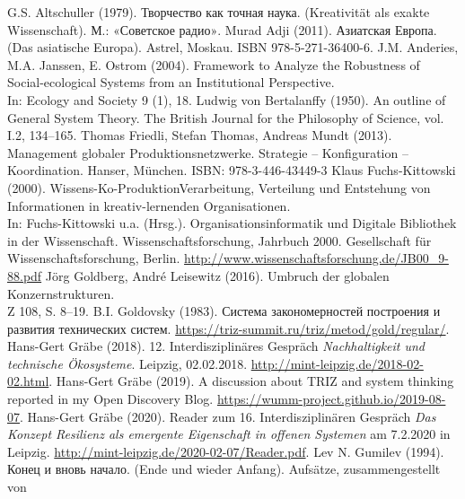 \documentclass[11pt,a4paper]{article}
\begin{document}
\begin{thebibliography}{xxx}
 G.S. Altschuller (1979).
  \foreignlanguage{russian}{Творчество как точная наука.} (Kreativität als
  exakte Wissenschaft). \foreignlanguage{russian}{М.: «Советское радио»}.
 Murad Adji (2011). \foreignlanguage{russian}{Азиатская
  Европа}. (Das asiatische Europa).  Astrel, Moskau. ISBN 978-5-271-36400-6.
 J.M. Anderies, M.A. Janssen, E. Ostrom (2004).
  Framework to Analyze the Robustness of Social-ecological Systems from an
  Institutional Perspective.\\ In: Ecology and Society 9 (1), 18.
 Ludwig von Bertalanffy (1950). An outline of General
  System Theory. The British Journal for the Philosophy of Science, vol. I.2,
  134–165.
 Thomas Friedli, Stefan Thomas, Andreas Mundt (2013).
  Management globaler Produktionsnetzwerke. Strategie – Konfiguration –
  Koordination. Hanser, München. ISBN: 978-3-446-43449-3
 Klaus Fuchs-Kittowski (2000).
  Wissens-Ko-ProduktionVerarbeitung, Verteilung und Entstehung von
  Informationen in kreativ-lernenden Organisationen.\\ In: Fuchs-Kittowski
  u.a. (Hrsg.). Organisationsinformatik und Digitale Bibliothek in der
  Wissenschaft. Wissenschaftsforschung, Jahrbuch 2000. Gesellschaft für
  Wissenschaftsforschung, Berlin.
  \url{http://www.wissenschaftsforschung.de/JB00_9-88.pdf}
 Jörg Goldberg, André Leisewitz (2016). Umbruch der
  globalen Konzernstrukturen.\\ Z 108, S. 8--19.
 B.I. Goldovsky (1983).
  \foreignlanguage{russian}{Система закономерностей построения и развития
    технических систем}.
  \url{https://triz-summit.ru/triz/metod/gold/regular/}.
 Hans-Gert Gräbe (2018).  12. Interdisziplinäres Gespräch
  \emph{Nachhaltigkeit und technische Ökosysteme}. Leipzig, 02.02.2018. 
    \url{http://mint-leipzig.de/2018-02-02.html}.
 Hans-Gert Gräbe (2019).  A discussion about TRIZ
    and system thinking reported in my Open Discovery Blog.
    \url{https://wumm-project.github.io/2019-08-07}.
 Hans-Gert Gräbe (2020). Reader zum 16. Interdisziplinären
  Gespräch \emph{Das Konzept Resilienz als emergente Eigenschaft in offenen
    Systemen} am 7.2.2020 in Leipzig.
  \url{http://mint-leipzig.de/2020-02-07/Reader.pdf}.
 Lev N. Gumilev (1994). \foreignlanguage{russian}{Конец и
  вновь начало}.  (Ende und wieder Anfang).  Aufsätze, zusammengestellt von

\end{thebibliography}
\end{document}
